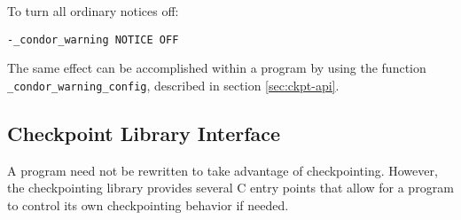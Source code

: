 To turn all ordinary notices off:

\begin{verbatim}
-_condor_warning NOTICE OFF
\end{verbatim}

The same effect can be accomplished within a program by using the function
\verb$_condor_warning_config$, described in section \ref{sec:ckpt-api}.

\subsection{\label{sec:ckpt-api}Checkpoint Library Interface}

A program need not be rewritten to take advantage of checkpointing.
However, the checkpointing library provides several C entry points
that allow for a program to control its own checkpointing behavior
if needed.

